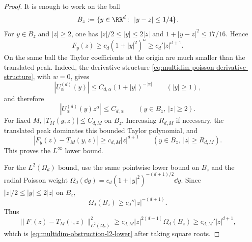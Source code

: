 \begin{proof}
It is enough to work on the ball
\[
B_z:=\{y\in\RR^d:\ |y-z|\le 1/4\}.
\]
For \(y\in B_z\) and \(|z|\ge2\), one has
\(|z|/2\le |y|\le 2|z|\) and \(1+|y-z|^2\le 17/16\).  Hence
\[
F_y(z)
\ge c_d(1+|y|^2)^a
\ge c_d'|z|^{d+1}.
\]
On the same ball the Taylor coefficients at the origin are much smaller than
the translated peak.  Indeed, the derivative structure
\eqref{eq:multidim-poisson-derivative-structure}, with \(w=0\), gives
\[
|U_\alpha^{(d)}(y)|
\le C_{d,\alpha}(1+|y|)^{-|\alpha|}
\qquad(|y|\ge1),
\]
and therefore
\[
|U_\alpha^{(d)}(y)z^\alpha|
\le C_{d,\alpha}
\qquad (y\in B_z,\ |z|\ge2).
\]
For fixed \(M\), \(|T_M(y,z)|\le C_{d,M}\) on \(B_z\).  Increasing
\(R_{d,M}\) if necessary, the translated peak dominates this bounded Taylor
polynomial, and
\[
|F_y(z)-T_M(y,z)|\ge c_{d,M}|z|^{d+1}
\qquad (y\in B_z,\ |z|\ge R_{d,M}).
\]
This proves the \(L^\infty\) lower bound.

For the \(L^2(\Omega_d)\) bound, use the same pointwise lower bound on
\(B_z\) and the radial Poisson weight
\(\Omega_d(\dd y)=c_d(1+|y|^2)^{-(d+1)/2}\dd y\).  Since
\(|z|/2\le |y|\le2|z|\) on \(B_z\),
\[
\Omega_d(B_z)\ge c_d''|z|^{-(d+1)}.
\]
Thus
\[
\|F_\cdot(z)-T_M(\cdot,z)\|_{L^2(\Omega_d)}^2
\ge c_{d,M}|z|^{2(d+1)}\Omega_d(B_z)
\ge c_{d,M}'|z|^{d+1},
\]
which is \eqref{eq:multidim-obstruction-l2-lower} after taking square roots.
\end{proof}

